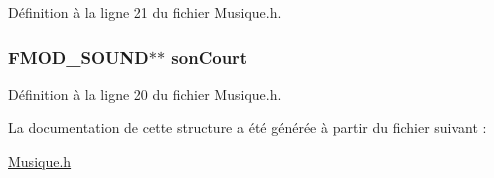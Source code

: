 Définition à la ligne 21 du fichier Musique.\-h.

\hypertarget{struct_musique_a752d8e2529422bc4d30b26cdbe9718bb}{
\subsubsection[{son\-Court}]{\setlength{\rightskip}{0pt plus 5cm}F\-M\-O\-D\-\_\-\-S\-O\-U\-N\-D$\ast$$\ast$ son\-Court}}\label{struct_musique_a752d8e2529422bc4d30b26cdbe9718bb}


Définition à la ligne 20 du fichier Musique.\-h.



La documentation de cette structure a été générée à partir du fichier suivant \-:\begin{DoxyCompactItemize}
\item 
\hyperlink{_musique_8h}{Musique.\-h}\end{DoxyCompactItemize}
